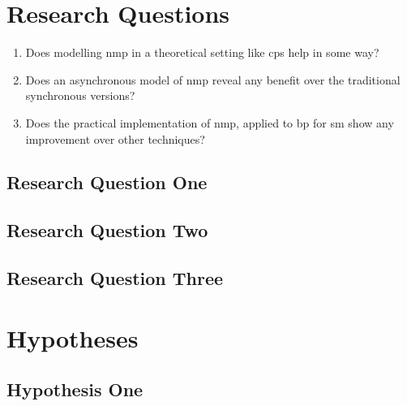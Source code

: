 \section{Research Questions}
\begin{enumerate}
    \item Does modelling \gls{nmp} in a theoretical setting like \gls{cps} help in some way?
    \item Does an asynchronous model of \gls{nmp} reveal any benefit over the traditional synchronous versions?
    \item Does the practical implementation of \gls{nmp}, applied to \gls{bp} for \gls{sm} show any improvement over other techniques?
\end{enumerate}

\subsection{Research Question One}

\subsection{Research Question Two}

\subsection{Research Question Three}

\section{Hypotheses}

\subsection{Hypothesis One}


